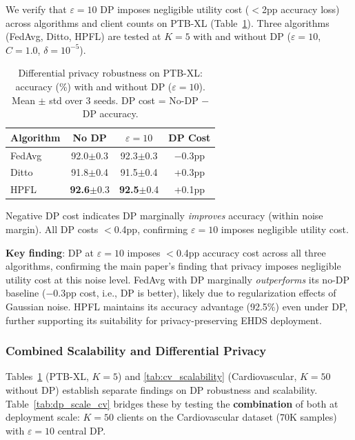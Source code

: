 \documentclass[conference]{IEEEtran}
\begin{document}
We verify that $\varepsilon{=}10$ DP imposes negligible utility cost ($<$2pp accuracy loss) across algorithms and client counts on PTB-XL (Table~\ref{tab:dp_scale}). Three algorithms (FedAvg, Ditto, HPFL) are tested at $K{=}5$ with and without DP ($\varepsilon{=}10$, $C{=}1.0$, $\delta{=}10^{-5}$).

\begin{table}[htbp]
\centering
\caption{Differential privacy robustness on PTB-XL: accuracy (\%) with and without DP ($\varepsilon{=}10$). Mean $\pm$ std over 3 seeds. DP cost = No-DP $-$ DP accuracy.}
\label{tab:dp_scale}
\small
\begin{tabular}{lccc}
\toprule
\textbf{Algorithm} & \textbf{No DP} & \textbf{$\varepsilon{=}10$} & \textbf{DP Cost} \\
\midrule
FedAvg & 92.0{\tiny$\pm$0.3} & 92.3{\tiny$\pm$0.3} & $-$0.3pp \\
Ditto & 91.8{\tiny$\pm$0.4} & 91.5{\tiny$\pm$0.4} & +0.3pp \\
HPFL & \textbf{92.6}{\tiny$\pm$0.3} & \textbf{92.5}{\tiny$\pm$0.4} & +0.1pp \\
\bottomrule
\end{tabular}

\vspace{1mm}
\footnotesize{Negative DP cost indicates DP marginally \textit{improves} accuracy (within noise margin). All DP costs $<$0.4pp, confirming $\varepsilon{=}10$ imposes negligible utility cost.}
\end{table}

\textbf{Key finding}: DP at $\varepsilon{=}10$ imposes $<$0.4pp accuracy cost across all three algorithms, confirming the main paper's finding that privacy imposes negligible utility cost at this noise level. FedAvg with DP marginally \textit{outperforms} its no-DP baseline ($-$0.3pp cost, i.e., DP is better), likely due to regularization effects of Gaussian noise. HPFL maintains its accuracy advantage (92.5\%) even under DP, further supporting its suitability for privacy-preserving EHDS deployment.

\subsubsection{Combined Scalability and Differential Privacy}
\label{sec:scalability_dp_cv}

Tables~\ref{tab:dp_scale} (PTB-XL, $K{=}5$) and \ref{tab:cv_scalability} (Cardiovascular, $K{=}50$ without DP) establish separate findings on DP robustness and scalability. Table~\ref{tab:dp_scale_cv} bridges these by testing the \textbf{combination} of both at deployment scale: $K{=}50$ clients on the Cardiovascular dataset (70K samples) with $\varepsilon{=}10$ central DP.
\end{document}
